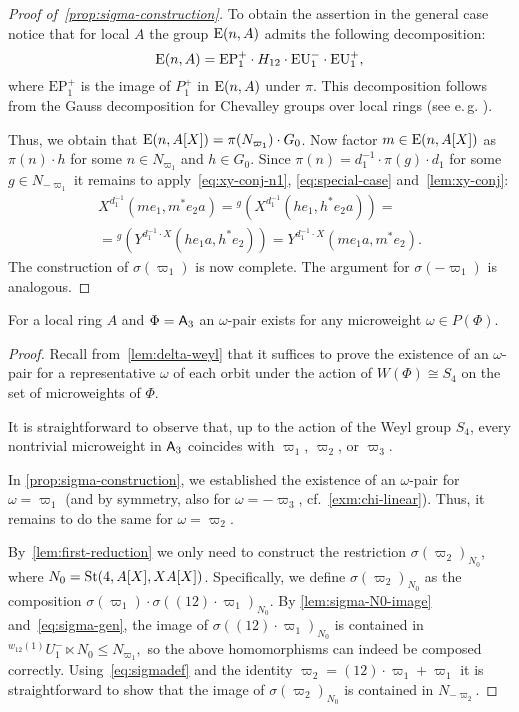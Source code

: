 \begin{proof}[Proof of~\cref{prop:sigma-construction}]
    To obtain the assertion in the general case notice that for local $A$ the group $\operatorname{E}(n, A)$ admits the following decomposition:
    \[\operatorname{E}(n, A) = \mathrm{EP}_1^+ \cdot H_{12} \cdot \mathrm{EU}^-_1 \cdot \mathrm{EU}^+_1, \]
    where $\mathrm{EP}_1^+$ is the image of $P_1^+$ in $\operatorname{E}(n, A)$ under $\pi$.
    This decomposition follows from the Gauss decomposition for Chevalley groups over local rings (see e.\,g. \cite[Theorem~1.1]{Sm12}).

    Thus, we obtain that $\operatorname{E}(n, A[X]) = \pi(N_{\varpi_1}) \cdot G_0$.
    Now factor $m \in \operatorname{E}(n, A[X])$ as $\pi(n) \cdot h$ for some $n\in N_{\varpi_1}$ and $h \in G_0$.
    Since $\pi(n) = d_1^{-1} \cdot \pi(g) \cdot d_1$ for some $g \in N_{-\varpi_1}$ it remains to apply~\eqref{eq:xy-conj-n1}, \eqref{eq:special-case} and~\cref{lem:xy-conj}:
    \begin{multline}
        \nonumber X^{d_1^{-1}}(me_1, m^*e_{2}a) = {}^{g}(X^{d_1^{-1}}(he_1, h^*e_{2}a)) = \\
        = {}^{g}(Y^{d_1^{-1} \cdot X}(he_{1}a, h^*e_2)) = Y^{d_1^{-1} \cdot X}(me_{1}a, m^{*} e_{2}).
    \end{multline}
    The construction of $\sigma(\varpi_1)$ is now complete.
    The argument for $\sigma(-\varpi_1)$ is analogous.
\end{proof}

\begin{cor} \label{cor:a3-microweight}
    For a local ring $A$ and $\Phi = \mathsf{A}_3$ an $\omega$-pair exists for any microweight $\omega \in P(\Phi)$.
\end{cor}
\begin{proof}
    Recall from~\cref{lem:delta-weyl} that it suffices to prove the existence of an $\omega$-pair for a representative $\omega$
    of each orbit under the action of $W(\Phi) \cong S_4$ on the set of microweights of $\Phi$.

    It is straightforward to observe that, up to the action of the Weyl group $S_4$, every nontrivial microweight in $\mathsf{A}_3$ coincides with
    $\varpi_1$, $\varpi_2$, or $\varpi_3$.

    In \cref{prop:sigma-construction}, we established the existence of an $\omega$-pair for $\omega = \varpi_1$
    (and by symmetry, also for $\omega = -\varpi_3$, cf.~\cref{exm:chi-linear}).
    Thus, it remains to do the same for $\omega = \varpi_{2}$.

    By~\cref{lem:first-reduction} we only need to construct the restriction $\sigma(\varpi_2)_{N_0}$, where $N_0 = \operatorname{St}(4, A[X], XA[X])$.
    Specifically, we define $\sigma(\varpi_2)_{N_0}$ as the composition
    $\sigma(\varpi_1) \cdot \sigma((12) \cdot \varpi_1)_{N_0}$.
    By \cref{lem:sigma-N0-image} and~\eqref{eq:sigma-gen}, the image of $\sigma((12) \cdot \varpi_1)_{N_0}$ is contained in
    ${}^{w_{12}(1)}U_1^- \ltimes N_0 \leq N_{\varpi_1},$ so the above homomorphisms can indeed be composed correctly.
    Using~\eqref{eq:sigmadef} and the identity
    $\varpi_2 = (12) \cdot \varpi_1 + \varpi_1$ it is straightforward to show that the image of $\sigma(\varpi_2)_{N_0}$ is contained in $N_{-\varpi_2}$.
\end{proof}

